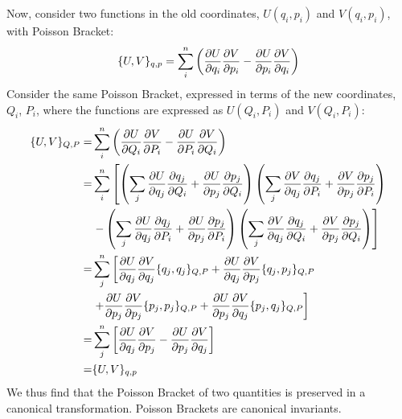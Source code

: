 Now, consider two functions in the old coordinates, $U(q_i,p_i)$ and $V(q_i,p_i)$, with Poisson Bracket:
\begin{align}
\{U,V\}_{q,p}=\sum_i^n\left(\die{U}{q_i}\die{V}{p_i}-\die{U}{p_i}\die{V}{q_i}\right)
\end{align}
Consider the same Poisson Bracket, expressed in terms of the new coordinates, $Q_i$, $P_i$, where the functions are expressed as $U(Q_i,P_i)$ and $V(Q_i,P_i)$:
\begin{align}
\{U,V\}_{Q,P}=&\sum_i^n\left(\die{U}{Q_i}\die{V}{P_i}-\die{U}{P_i}\die{V}{Q_i}\right)\nonumber\\
=&\sum_i^n\left[\left(\sum_j\die{U}{q_j}\die{q_j}{Q_i}+\die{U}{p_j}\die{p_j}{Q_i}\right)\left(\sum_j\die{V}{q_j}\die{q_j}{P_i}+\die{V}{p_j}\die{p_j}{P_i}\right) \right.\nonumber\\
&\left. -\left(\sum_j\die{U}{q_j}\die{q_j}{P_i}+\die{U}{p_j}\die{p_j}{P_i}\right)\left(\sum_j\die{V}{q_j}\die{q_j}{Q_i}+\die{V}{p_j}\die{p_j}{Q_i}\right)\right]\nonumber\\
=&\sum_{j}^n\left[\die{U}{q_j}\die{V}{q_j}\{ q_j,q_j\}_{Q,P}+\die{U}{q_j}\die{V}{p_j}\{ q_j,p_j\}_{Q,P}\right.\nonumber\\
&\left. +\die{U}{p_j}\die{V}{p_j}\{ p_j,p_j\}_{Q,P}+\die{U}{p_j}\die{V}{q_j}\{p_j,q_j\}_{Q,P}\right ]\nonumber\\
=&\sum_{j}^n\left[\die{U}{q_j}\die{V}{p_j}-\die{U}{p_j}\die{V}{q_j}\right ]\nonumber\\
=&\{U,V\}_{q,p}
\end{align}
We thus find that the Poisson Bracket of two quantities is preserved in a canonical transformation. Poisson Brackets are canonical invariants.

